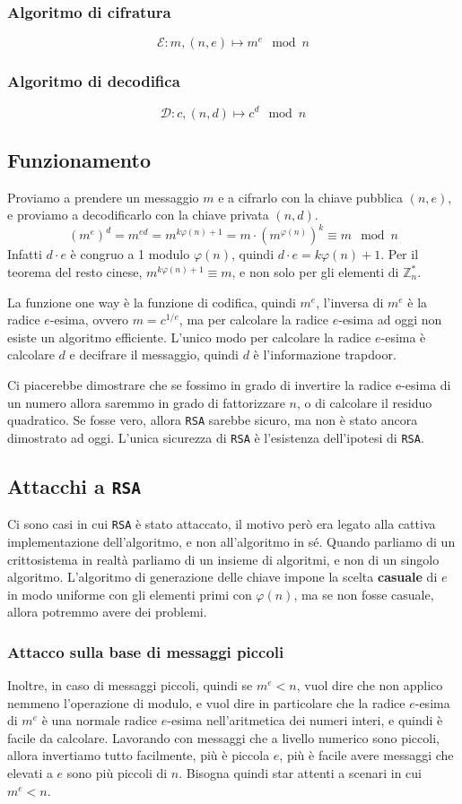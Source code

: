 \subsubsection{Algoritmo di cifratura}
\[
  \mathcal{E}: m, (n, e) \mapsto m^e \mod n  
\]
\subsubsection{Algoritmo di decodifica}
\[
  \mathcal{D}: c, (n, d) \mapsto c^d \mod n
\]
\subsection{Funzionamento}
Proviamo a prendere un messaggio $m$ e a cifrarlo con la chiave pubblica $(n, e)$,
e proviamo a decodificarlo con la chiave privata $(n, d)$.
\[
  (m^e)^d = m^{ed} = m^{k\varphi(n) + 1} = m \cdot (m^{\varphi(n)})^k \equiv m \mod n  
\]
Infatti $d\cdot e$ è congruo a 1 modulo $\varphi(n)$, quindi $d\cdot e = k\varphi(n) + 1$.
Per il teorema del resto cinese, $m^{k\varphi(n) + 1} \equiv m$, e non solo per gli elementi 
di $\mathbb{Z}_n^*$.

La funzione one way è la funzione di codifica, quindi $m^e$, l'inversa di 
$m^e$ è la radice $e$-esima, ovvero $m = c^{1/e}$, ma per calcolare la radice $e$-esima
ad oggi non esiste un algoritmo efficiente. L'unico modo per calcolare la radice $e$-esima
è calcolare $d$ e decifrare il messaggio, quindi $d$ è l'informazione trapdoor.

Ci piacerebbe dimostrare che se fossimo in grado di invertire la radice 
e-esima di un numero allora saremmo in grado di fattorizzare $n$, o di calcolare 
il residuo quadratico. Se fosse vero, allora \texttt{RSA} sarebbe sicuro, ma non è stato ancora
dimostrato ad oggi. L'unica sicurezza di \texttt{RSA} è l'esistenza dell'ipotesi di \texttt{RSA}.
\subsection{Attacchi a \texttt{RSA}}
Ci sono casi in cui \texttt{RSA} è stato attaccato, il motivo però era legato alla cattiva 
implementazione dell'algoritmo, e non all'algoritmo in sé.
Quando parliamo di un crittosistema in realtà parliamo di un insieme di algoritmi,
e non di un singolo algoritmo. L'algoritmo di generazione delle chiave impone 
la scelta \textbf{casuale} di $e$ in modo uniforme con gli elementi 
primi con $\varphi(n)$, ma se non fosse casuale, allora potremmo avere dei problemi.
\subsubsection{Attacco sulla base di messaggi piccoli}
Inoltre, in caso di messaggi piccoli, quindi se $m^e < n$, vuol dire che 
non applico nemmeno l'operazione di modulo, e vuol dire in particolare che 
la radice $e$-esima di $m^e$ è una normale radice $e$-esima nell'aritmetica 
dei numeri interi, e quindi è facile da calcolare.
Lavorando con messaggi che a livello numerico sono piccoli, allora 
invertiamo tutto facilmente, più è piccola $e$, più è facile avere 
messaggi che elevati a $e$ sono più piccoli di $n$. Bisogna quindi
star attenti a scenari in cui $m^e < n$.
